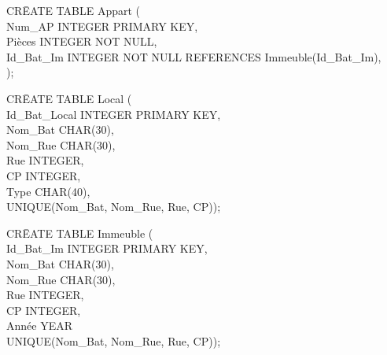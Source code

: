 \documentclass[a4paper,10.5pt]{report}
\begin{document}
		\begin{tabbing}
			CR\=EATE TABLE Appart (\\
			\> Num\_AP INTEGER PRIMARY KEY,\\
			\> Pièces INTEGER NOT NULL,\\
			\> Id\_Bat\_Im INTEGER NOT NULL REFERENCES Immeuble(Id\_Bat\_Im),\\);
		\end{tabbing}
                                                   
		\begin{tabbing}
			CR\=EATE TABLE Local (\\
			\> Id\_Bat\_Local INTEGER PRIMARY KEY,\\
			\> Nom\_Bat CHAR(30),\\
			\> Nom\_Rue CHAR(30),\\
			\> Rue INTEGER,\\
			\> CP INTEGER,\\
			\> Type CHAR(40),\\
			\> UNIQUE(Nom\_Bat, Nom\_Rue, Rue, CP));
		\end{tabbing}
		\begin{tabbing}
			CR\=EATE TABLE Immeuble (\\
			\> Id\_Bat\_Im INTEGER PRIMARY KEY,\\
			\> Nom\_Bat CHAR(30),\\
			\> Nom\_Rue CHAR(30),\\
			\> Rue INTEGER,\\
			\> CP INTEGER,\\
			\> Année YEAR\\
			\> UNIQUE(Nom\_Bat, Nom\_Rue, Rue, CP));
		\end{tabbing}
\end{document}
